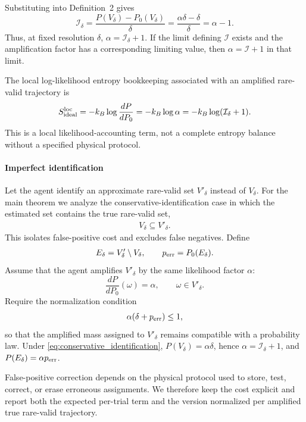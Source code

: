\documentclass[
  aps,
  prresearch,
  reprint,
  amsmath,
  amssymb,
  superscriptaddress,
  nofootinbib,
  longbibliography
]{revtex4-2}
\def\EQSP{3pt}
\newcommand{\cgather}[2][\EQSP]{\begingroup\setlength\abovedisplayskip{#1}\setlength\belowdisplayskip{#1}\begin{gather} #2 \end{gather}\endgroup\noindent}
\newcommand{\cgathers}[2][\EQSP]{\begingroup\setlength\abovedisplayskip{#1}\setlength\belowdisplayskip{#1}\begin{gather*} #2 \end{gather*}\endgroup\noindent}
\newcommand{\calI}{\mathcal{I}}
\begin{document}
Substituting into Definition~2 gives
\begin{equation}
\mathcal I_\delta
=
\frac{P(V_\delta)-P_0(V_\delta)}{\delta}
=
\frac{\alpha\delta-\delta}{\delta}
=
\alpha-1.
\end{equation}
Thus, at fixed resolution \(\delta\),
$ \alpha=\mathcal I_\delta+1.$ If the limit defining \(\mathcal I\) exists and the amplification factor has a corresponding limiting value, then \(\alpha=\mathcal I+1\) in that limit.

The local log-likelihood entropy bookkeeping associated with an amplified rare-valid trajectory is
\cgathers{
S_{\rm ideal}^{\rm loc}
=
-k_B \log \frac{dP}{dP_0}
=
-k_B\log\alpha
=
-k_B\log(\mathcal I_\delta+1).
}
This is a local likelihood-accounting term, not a complete entropy balance without a specified physical protocol.

\paragraph{Imperfect identification}

Let the agent identify an approximate rare-valid set \(V'_\delta\) instead of \(V_\delta\). For the main theorem we analyze the conservative-identification case in which the estimated set contains the true rare-valid set,
\cgather{
    V_\delta \subseteq V'_\delta.
    \label{eq:conservative_identification}
}
This isolates false-positive cost and excludes false negatives. Define
\cgather{
    E_\delta = V'_\delta\setminus V_\delta,
    \qquad
    p_{\rm err}=P_0(E_\delta).
}
Assume that the agent amplifies \(V'_\delta\) by the same likelihood factor \(\alpha\):
\begin{equation}
\frac{dP}{dP_0}(\omega)=\alpha,
\qquad \omega\in V'_\delta.
\end{equation}
Require the normalization condition
\cgather{
    \alpha(\delta+p_{\rm err})\leq 1,
    \label{eq:imperfect_normalization_condition}
}
so that the amplified mass assigned to \(V'_\delta\) remains compatible with a probability law. Under \eqref{eq:conservative_identification}, \(P(V_\delta)=\alpha\delta\), hence \(\alpha=\calI_\delta+1\), and \(P(E_\delta)=\alpha p_{\rm err}\).

False-positive correction depends on the physical protocol used to store, test, correct, or erase erroneous assignments. We therefore keep the cost explicit and report both the expected per-trial term and the version normalized per amplified true rare-valid trajectory.
\end{document}
